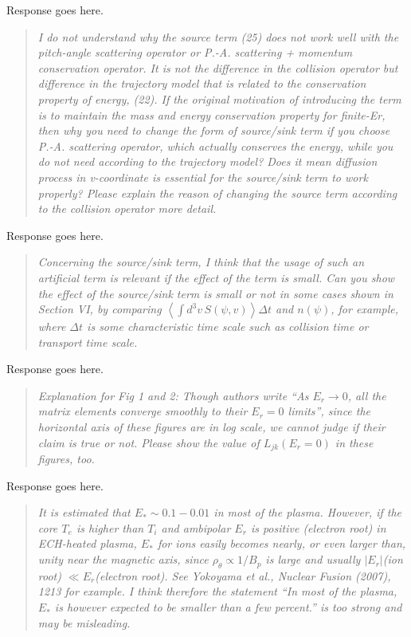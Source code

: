 \documentclass[11pt]{article}
\newenvironment{referee}{\begin{quote}\it\color{Blue}}{\end{quote}}
\begin{document}
Response goes here.

\begin{referee}
I do not understand why the source term (25) does not work well with the pitch-angle scattering
operator or P.-A. scattering + momentum conservation operator. It is not the difference in the
collision operator but difference in the trajectory model that is related to the conservation
property of energy, (22). If the original motivation of introducing the term is to maintain the
mass and energy conservation property for finite-Er, then why you need to change the form of
source/sink term if you choose P.-A. scattering operator, which actually conserves the energy,
while you do not need according to the trajectory model? Does it mean diffusion process in
v-coordinate is essential for the source/sink term to work properly?
Please explain the reason of changing the source term according to the collision operator more
detail.
\end{referee}

Response goes here.

\begin{referee}
Concerning the source/sink term, I think that the usage of such an artificial term is relevant if
the effect of the term is small. Can you show the effect of the source/sink term is small or not in
some cases shown in Section VI, by comparing $\left< \int d^3v\, S(\psi,v) \right> \Delta t$ and $n(\psi)$, for example, where
$\Delta t$ is some characteristic time scale such as collision time or transport time scale.
\end{referee}

Response goes here.

\begin{referee}
Explanation for Fig 1 and 2: Though authors write ``As $E_r \to 0$, all the matrix elements converge
smoothly to their $E_r = 0$ limits'', since the horizontal axis of these figures are in log scale, we
cannot judge if their claim is true or not. Please show the value of $L_{jk}(E_r=0)$ in these figures,
too.
\end{referee}

Response goes here.

\begin{referee}
It is estimated that $E_* \sim 0.1 - 0.01$ in most of the plasma. However, if the core $T_e$ is higher than
$T_i$ and ambipolar $E_r$ is positive (electron root) in ECH-heated plasma, $E_*$ for ions easily becomes
nearly, or even larger than, unity near the magnetic axis, since $\rho_\theta \propto 1/B_p$ is large and usually
$|E_r|$(ion root) $\ll E_r$(electron root). See Yokoyama et al., Nuclear Fusion (2007), 1213 for example.
I think therefore the statement ``In most of the plasma, $E_*$ is however expected to be smaller
than a few percent.'' is too strong and may be misleading.
\end{referee}
\end{document}
